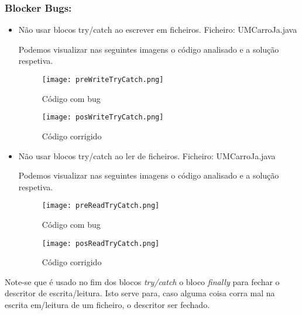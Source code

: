 \subsubsection{Blocker Bugs:}
\begin{itemize}
\item Não usar blocos try/catch ao escrever em ficheiros.\newline
 Ficheiro: UMCarroJa.java\newline


\par Podemos visualizar nas seguintes imagens o código analisado e a solução respetiva.

\begin{figure}[H]

  \centering

  \texttt{[image: preWriteTryCatch.png]}

  \caption {Código com bug}

  \label {fig02}

\end{figure}

\begin{figure}[H]

  \centering

  \texttt{[image: posWriteTryCatch.png]}

  \caption {Código corrigido}

  \label {fig03}

\end{figure}

\item Não usar blocos try/catch ao ler de ficheiros.\newline
 Ficheiro: UMCarroJa.java\newline


\par Podemos visualizar nas seguintes imagens o código analisado e a solução respetiva.


\begin{figure}[H]

  \centering

  \texttt{[image: preReadTryCatch.png]}

  \caption {Código com bug}

  \label {fig04}

\end{figure}

\begin{figure}[H]

  \centering

  \texttt{[image: posReadTryCatch.png]}

  \caption {Código corrigido}

  \label {fig05}

\end{figure}

\end{itemize}
\par Note-se que é usado no fim dos blocos \textit{try/catch} o bloco \textit{finally} para fechar o descritor de escrita/leitura. Isto serve para, caso alguma coisa corra mal na escrita em/leitura de um ficheiro, o descritor ser fechado. 


